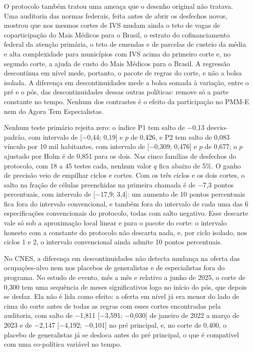 \documentclass[11pt,a4paper]{article}
\begin{document}
O protocolo também tratou uma ameaça que o desenho original não tratava. Uma
auditoria das normas federais, feita antes de abrir os desfechos novos,
mostrou que nos mesmos cortes de IVS mudam ainda o teto de vagas de
coparticipação do Mais Médicos para o Brasil, o estrato do cofinanciamento
federal da atenção primária, o teto de emendas e de parcelas de custeio da
média e alta complexidade para municípios com IVS acima do primeiro corte e, no
segundo corte, a ajuda de custo do Mais Médicos para o Brasil. A regressão
descontínua em nível mede, portanto, o pacote de regras do corte, e não a bolsa
isolada. A diferença em descontinuidades mede a bolsa somada à variação, entre
o pré e o pós, das descontinuidades dessas outras políticas: remove só a parte
constante no tempo. Nenhum dos contrastes é o efeito da participação no PMM-E
nem do Agora Tem Especialistas.

Nenhum teste primário rejeita zero: o índice P1 tem salto de $-$0,13
desvio-padrão, com intervalo de [$-$0,44; 0,19] e $p$ de 0,426, e P2 tem salto
de 0,083 vínculo por 10 mil habitantes, com intervalo de [$-$0,309; 0,476] e
$p$ de 0,677; o $p$ ajustado por Holm é de 0,851 para os dois. Nas cinco
famílias de desfechos do protocolo, com 18 a 45 testes cada, nenhum valor $q$
fica abaixo de 5\%. O ganho de precisão veio de empilhar ciclos e cortes. Com
os três ciclos e os dois cortes, o salto na fração de células preenchidas na
primeira chamada é de $-$7,3 pontos percentuais, com intervalo de
[$-$17,9; 3,4]: um aumento de 10 pontos percentuais fica fora do intervalo
convencional, e também fora do intervalo de cada uma das 6 especificações
convencionais do protocolo, todas com salto negativo. Esse descarte vale só sob
a aproximação local linear e para o pacote do corte: o intervalo honesto com a
constante do protocolo não descarta nada, e, por ciclo isolado, nos ciclos 1 e
2, o intervalo convencional ainda admite 10 pontos percentuais.

No CNES, a diferença em descontinuidades não detecta mudança na oferta das
ocupações-alvo nem nos placebos de generalistas e de especialistas fora do
programa. No estudo de evento, mês a mês e relativo a junho de 2025, o corte de
0,300 tem uma sequência de meses significativos logo no início do pós, que
depois se desfaz. Ela não é lida como efeito: a oferta em nível já era menor do
lado de cima do corte antes de todas as regras com esses cortes encontradas
pela auditoria, com salto de $-$1,811 [$-$3,591; $-$0,030] de janeiro de 2022 a
março de 2023 e de $-$2,147 [$-$4,192; $-$0,101] no pré principal, e, no corte
de 0,400, o placebo de generalistas já se desloca antes do pré principal, o que
é compatível com uma co-política variável no tempo.
\end{document}
